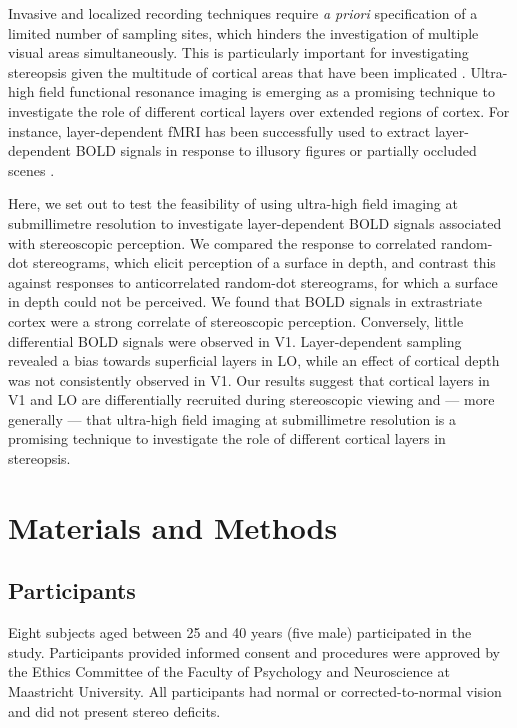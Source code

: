 Invasive and localized recording techniques require \textit{a priori} specification of a limited number of sampling sites, which hinders the investigation of multiple visual areas simultaneously. This is particularly important for investigating stereopsis given the multitude of cortical areas that have been implicated \cite{Preston:2008dg}. Ultra-high field functional resonance imaging is emerging as a promising technique to investigate the role of different cortical layers over extended regions of cortex. For instance, layer-dependent fMRI has been successfully used to extract layer-dependent BOLD signals in response to illusory figures \cite{Kok:2016fk} or partially occluded scenes \cite{Muckli:2015wb}.

Here, we set out to test the feasibility of using ultra-high field imaging at submillimetre resolution to investigate layer-dependent BOLD signals associated with stereoscopic perception. We compared the response to correlated random-dot stereograms, which elicit perception of a surface in depth, and contrast this against responses to anticorrelated random-dot stereograms, for which a surface in depth could not be perceived. We found that BOLD signals in extrastriate cortex were a strong correlate of stereoscopic perception. Conversely, little differential BOLD signals were observed in V1. Layer-dependent sampling revealed a bias towards superficial layers in LO, while an effect of cortical depth was not consistently observed in V1. Our results suggest that cortical layers in V1 and LO are differentially recruited during stereoscopic viewing and --- more generally --- that ultra-high field imaging at submillimetre resolution is a promising technique to investigate the role of different cortical layers in stereopsis.


\section{Materials and Methods}

\subsection{Participants}
Eight subjects aged between 25 and 40 years (five male) participated in the study. Participants provided informed consent and procedures were approved by the Ethics Committee of the Faculty of Psychology and Neuroscience at Maastricht University. All participants had normal or corrected-to-normal vision and did not present stereo deficits.

